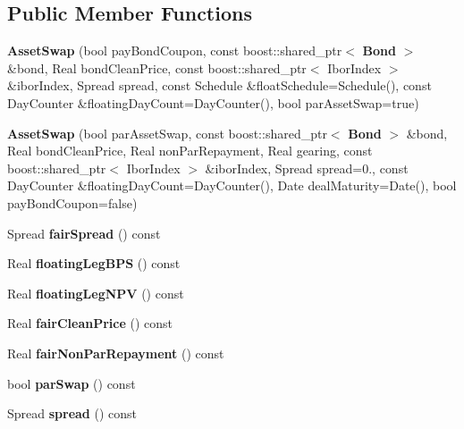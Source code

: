 \subsection*{Public Member Functions}
\begin{DoxyCompactItemize}
\item 
{\bfseries Asset\+Swap} (bool pay\+Bond\+Coupon, const boost\+::shared\+\_\+ptr$<$ {\bf Bond} $>$ \&bond, Real bond\+Clean\+Price, const boost\+::shared\+\_\+ptr$<$ Ibor\+Index $>$ \&ibor\+Index, Spread spread, const Schedule \&float\+Schedule=Schedule(), const Day\+Counter \&floating\+Day\+Count=Day\+Counter(), bool par\+Asset\+Swap=true)\label{class_quant_lib_1_1_asset_swap_a1122daa5896349bcbd5f724e16c4c68d}

\item 
{\bfseries Asset\+Swap} (bool par\+Asset\+Swap, const boost\+::shared\+\_\+ptr$<$ {\bf Bond} $>$ \&bond, Real bond\+Clean\+Price, Real non\+Par\+Repayment, Real gearing, const boost\+::shared\+\_\+ptr$<$ Ibor\+Index $>$ \&ibor\+Index, Spread spread=0., const Day\+Counter \&floating\+Day\+Count=Day\+Counter(), Date deal\+Maturity=Date(), bool pay\+Bond\+Coupon=false)\label{class_quant_lib_1_1_asset_swap_a29adbaeaa9c77b1ed228dc0d8c822f3c}

\item 
Spread {\bfseries fair\+Spread} () const \label{class_quant_lib_1_1_asset_swap_afbbed86d5d76d8c2282b7bc98cd7d0f6}

\item 
Real {\bfseries floating\+Leg\+B\+PS} () const \label{class_quant_lib_1_1_asset_swap_a932fade3edf70e0ff0080a5379bd449f}

\item 
Real {\bfseries floating\+Leg\+N\+PV} () const \label{class_quant_lib_1_1_asset_swap_a3d46e08b7c304b1d7f331497fe2be0eb}

\item 
Real {\bfseries fair\+Clean\+Price} () const \label{class_quant_lib_1_1_asset_swap_ab1af64e96b92409a04b9e44f3de2c7b0}

\item 
Real {\bfseries fair\+Non\+Par\+Repayment} () const \label{class_quant_lib_1_1_asset_swap_ad0ed22613ea230a40e35bdd555d9147d}

\item 
bool {\bfseries par\+Swap} () const \label{class_quant_lib_1_1_asset_swap_a04c97830957ce2df2d77b605c7e282c7}

\item 
Spread {\bfseries spread} () const \label{class_quant_lib_1_1_asset_swap_a83843504f87cdc65f4f4b88d34756d63}


\end{DoxyCompactItemize}
